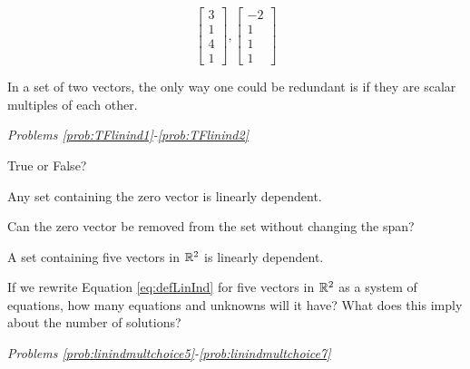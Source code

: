\documentclass{ximera}
\begin{document}
\begin{problem}\label{prob:linindmultchoice4}
$$\begin{bmatrix}3\\1\\4\\1\end{bmatrix}, \begin{bmatrix}-2\\1\\1\\1\end{bmatrix}$$

\begin{multipleChoice}
 \end{multipleChoice}
 \begin{hint}
 In a set of two vectors, the only way one could be redundant is if they are scalar multiples of each other.
 \end{hint}

\end{problem}


\emph{Problems \ref{prob:TFlinind1}-\ref{prob:TFlinind2}}

True or False?

\begin{problem}\label{prob:TFlinind1}
Any set containing the zero vector is linearly dependent.
\begin{multipleChoice}
 \end{multipleChoice}
  \begin{hint}
 Can the zero vector be removed from the set without changing the span?
 \end{hint}
 \end{problem}
 
\begin{problem}\label{prob:TFlinind2}
A set containing five vectors in $\mathbb{R}^2$ is linearly dependent.
\begin{multipleChoice}
 \end{multipleChoice}
  \begin{hint}
 If we rewrite Equation \ref{eq:defLinInd} for five vectors in $\mathbb{R}^2$ as a system of equations, how many equations and unknowns will it have?  What does this imply about the number of solutions?
 \end{hint}
\end{problem}


\emph{Problems \ref{prob:linindmultchoice5}-\ref{prob:linindmultchoice7}}
\end{document}
